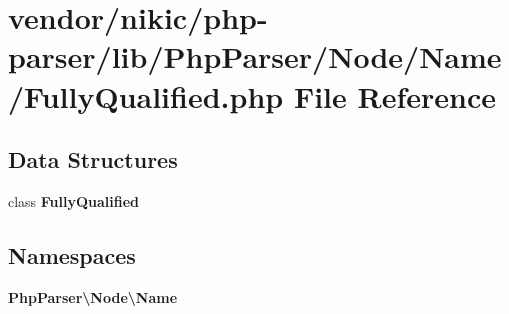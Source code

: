\section{vendor/nikic/php-\/parser/lib/\+Php\+Parser/\+Node/\+Name/\+Fully\+Qualified.php File Reference}
\label{_fully_qualified_8php}
\subsection*{Data Structures}
\begin{DoxyCompactItemize}
\item 
class {\bf Fully\+Qualified}
\end{DoxyCompactItemize}
\subsection*{Namespaces}
\begin{DoxyCompactItemize}
\item 
 {\bf Php\+Parser\textbackslash{}\+Node\textbackslash{}\+Name}
\end{DoxyCompactItemize}
